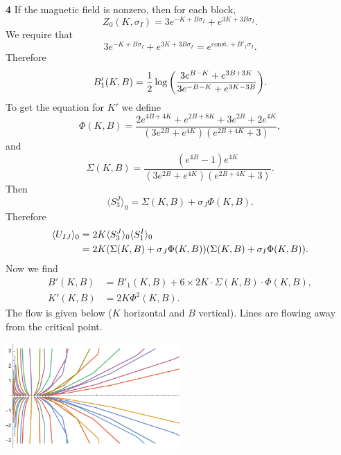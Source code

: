 \documentclass{article}
\makeatletter
\newcommand*{\shifttext}[1]{%
  \settowidth{\@tempdima}{#1}%
  \hspace{-\@tempdima}#1%
}
\newcommand{\plabel}[1]{%
\shifttext{\textbf{#1}\quad}%
}
\makeatother
\begin{document}
\plabel{4}%
If the magnetic field is nonzero, then for each block,
\[ Z_0(K,\sigma_I) = 3e^{-K + B\sigma_I} + e^{3K + 3B\sigma_I}. \]
We require that
\[ 3e^{-K + B\sigma_I} + e^{3K + 3B\sigma_I} = e^{\text{const.} + B'_1 \sigma_I}. \]
Therefore
\[ B'_1(K,B) = \frac{1}{2}\log\qty(\frac{3 e^{B-K} + e^{3B+3K}}{3e^{-B-K} + e^{3K-3B}}). \]
To get the equation for $K'$ we define
\[ \Phi(K,B) = \frac{2 e^{4 B+4 K}+e^{2 B+8 K}+3 e^{2 B}+2 e^{4 K}}{\left(3 e^{2 B}+e^{4 K}\right) \left(e^{2 B+4 K}+3\right)}, \]
and
\[ \Sigma(K,B) = \frac{\left(e^{4 B}-1\right) e^{4 K}}{\left(3 e^{2 B}+e^{4 K}\right) \left(e^{2 B+4 K}+3\right)}. \]
Then
\[ \langle S^J_3 \rangle_0 = \Sigma(K,B) + \sigma_J \Phi(K,B). \]
Therefore
\begin{align*}
    \langle U_{IJ} \rangle_0 &= 2K  \langle S^J_3 \rangle_0  \langle S^I_1 \rangle_0 \\
    &= 2K \qty(\Sigma(K,B) + \sigma_J \Phi(K,B)) \qty(\Sigma(K,B) + \sigma_I \Phi(K,B)).
\end{align*}
Now we find
\begin{align*}
    B'(K,B) &= B'_1(K,B) + 6\times 2K\cdot \Sigma(K,B) \cdot \Phi(K,B), \\
    K'(K,B) &= 2K \Phi^2(K,B).
\end{align*}
The flow is given below ($K$ horizontal and $B$ vertical).
Lines are flowing away from the critical point.
\begin{center}
    \includegraphics[width=0.5\textwidth]{img/Q4.pdf}
\end{center}

% 
% 
\end{document}
